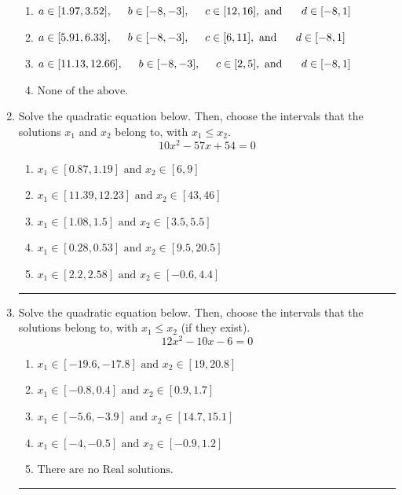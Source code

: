 \documentclass[14pt]{extbook}
\newcommand{\litem}[1]{\item#1\hspace*{-1cm}\rule{\textwidth}{0.4pt}}
\begin{document}
\begin{enumerate}
{\begin{enumerate}[label=\Alph*.]
\item \( a \in [1.97, 3.52], \hspace*{5mm} b \in [-8, -3], \hspace*{5mm} c \in [12, 16], \text{ and } \hspace*{5mm} d \in [-8, 1] \)
\item \( a \in [5.91, 6.33], \hspace*{5mm} b \in [-8, -3], \hspace*{5mm} c \in [6, 11], \text{ and } \hspace*{5mm} d \in [-8, 1] \)
\item \( a \in [11.13, 12.66], \hspace*{5mm} b \in [-8, -3], \hspace*{5mm} c \in [2, 5], \text{ and } \hspace*{5mm} d \in [-8, 1] \)
\item \( \text{None of the above.} \)

\end{enumerate} }
\litem{
Solve the quadratic equation below. Then, choose the intervals that the solutions $x_1$ and $x_2$ belong to, with $x_1 \leq x_2$.\[ 10x^{2} -57 x + 54 = 0 \]\begin{enumerate}[label=\Alph*.]
\item \( x_1 \in [0.87, 1.19] \text{ and } x_2 \in [6, 9] \)
\item \( x_1 \in [11.39, 12.23] \text{ and } x_2 \in [43, 46] \)
\item \( x_1 \in [1.08, 1.5] \text{ and } x_2 \in [3.5, 5.5] \)
\item \( x_1 \in [0.28, 0.53] \text{ and } x_2 \in [9.5, 20.5] \)
\item \( x_1 \in [2.2, 2.58] \text{ and } x_2 \in [-0.6, 4.4] \)

\end{enumerate} }
\litem{
Solve the quadratic equation below. Then, choose the intervals that the solutions belong to, with $x_1 \leq x_2$ (if they exist).\[ 12x^{2} -10 x -6 = 0 \]\begin{enumerate}[label=\Alph*.]
\item \( x_1 \in [-19.6, -17.8] \text{ and } x_2 \in [19, 20.8] \)
\item \( x_1 \in [-0.8, 0.4] \text{ and } x_2 \in [0.9, 1.7] \)
\item \( x_1 \in [-5.6, -3.9] \text{ and } x_2 \in [14.7, 15.1] \)
\item \( x_1 \in [-4, -0.5] \text{ and } x_2 \in [-0.9, 1.2] \)
\item \( \text{There are no Real solutions.} \)


\end{enumerate}}
\end{enumerate}
\end{document}
